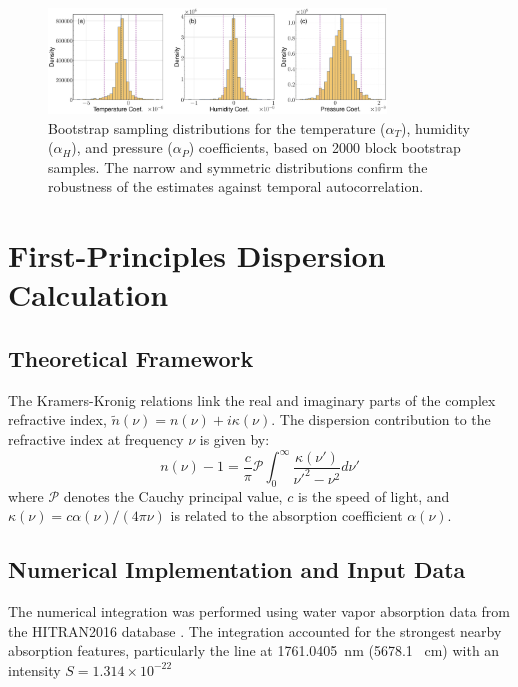\documentclass[aps,pra,reprint,groupedaddress,twocolumn,superscriptaddress]{revtex4-2}
\begin{document}
\begin{figure}
\centering
\includegraphics[width=0.8\textwidth]{figures/bootstrap_coefficient_distributions.pdf}
\caption{Bootstrap sampling distributions for the temperature ($\alpha_T$), humidity ($\alpha_H$), and pressure ($\alpha_P$) coefficients, based on 2000 block bootstrap samples. The narrow and symmetric distributions confirm the robustness of the estimates against temporal autocorrelation.}
\label{fig:bootstrap_distributions}
\end{figure}


\section{First-Principles Dispersion Calculation}
\label{app:dispersion}

\subsection{Theoretical Framework}

The Kramers-Kronig relations link the real and imaginary parts of the complex refractive index, $\tilde{n}(\nu) = n(\nu) + i\kappa(\nu)$. The dispersion contribution to the refractive index at frequency $\nu$ is given by:
\begin{equation}
n(\nu) - 1 = \frac{c}{\pi} \mathcal{P} \int_{0}^{\infty} \frac{\kappa(\nu')}{\nu'^2 - \nu^2}  d\nu'
\end{equation}
where $\mathcal{P}$ denotes the Cauchy principal value, $c$ is the speed of light, and $\kappa(\nu) = c\alpha(\nu)/(4\pi\nu)$ is related to the absorption coefficient $\alpha(\nu)$.

\subsection{Numerical Implementation and Input Data}

The numerical integration was performed using water vapor absorption data from the HITRAN2016 database \cite{kochanov2016hitran}. The integration accounted for the strongest nearby absorption features, particularly the line at \SI{1761.0405}{\nano\meter} (5678.1 \si{\per\centi\meter}) with an intensity $S = 1.314 \times 10^{-22}$ %
\end{document}
